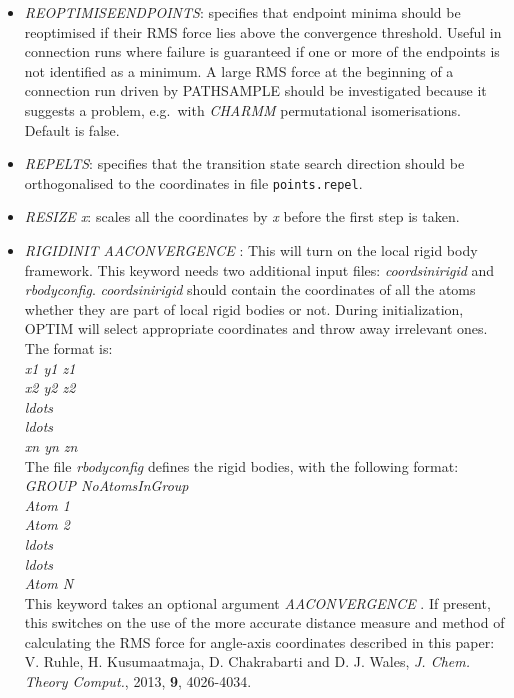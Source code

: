 \documentclass[12pt,a4paper,dvips]{article}
\begin{document}
\begin{itemize}
\item {\it REOPTIMISEENDPOINTS\/}: specifies that endpoint minima should be reoptimised
if their RMS force lies above the convergence threshold. Useful in connection 
runs where failure is guaranteed if one or more of the endpoints is not identified
as a minimum. A large RMS force at the beginning of a connection run driven
by PATHSAMPLE should be investigated because it suggests a problem, e.g.~with
{\it CHARMM\/} permutational isomerisations.
Default is false.

\item {\it REPELTS\/}: specifies that the transition state search direction should
be orthogonalised to the coordinates in file {\tt points.repel}.

\item {\it RESIZE x\/}: scales all the coordinates by {\it x}
before the first step is taken. 

\item {\it RIGIDINIT AACONVERGENCE \/}: This will turn on the local rigid body framework. This keyword needs two additional input files: {\it coordsinirigid\/} and {\it rbodyconfig\/}. {\it coordsinirigid\/} should contain the coordinates of all the atoms whether they are part of local rigid bodies or not. During initialization, OPTIM will select appropriate coordinates and throw away irrelevant ones. The format is: \\{\it x1 y1 z1} \\
{\it x2 y2 z2} \\
{\it ldots} \\
{\it ldots} \\
{\it xn yn zn} \\

The file {\it rbodyconfig\/} defines the rigid bodies, with the following format: \\
{\it GROUP NoAtomsInGroup} \\
{\it Atom 1} \\
{\it Atom 2} \\
{\it ldots} \\
{\it ldots} \\
{\it Atom N} \\

This keyword takes an optional argument {\it AACONVERGENCE \/}. If present, this switches on the use of the more accurate distance measure and method of calculating the RMS force for angle-axis coordinates described in this paper: V. Ruhle, H. Kusumaatmaja, D. Chakrabarti and D. J. Wales, {\it J. Chem. Theory Comput.}, 2013, {\bf 9}, 4026-4034.


\end{itemize}
\end{document}
